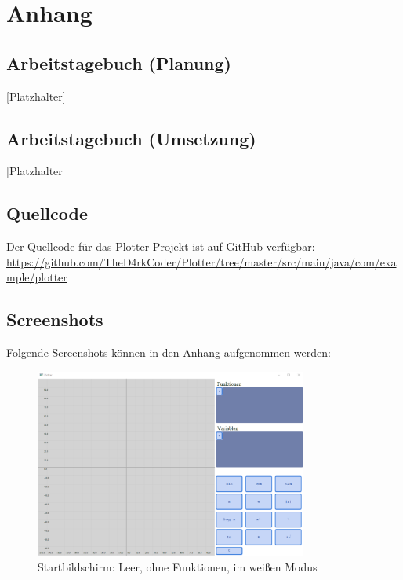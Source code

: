 \documentclass[a4paper]{article}
\begin{document}
\newpage

\section{Anhang}

\subsection{Arbeitstagebuch (Planung)}
[Platzhalter]

\subsection{Arbeitstagebuch (Umsetzung)}
[Platzhalter]

\subsection{Quellcode}
Der Quellcode für das Plotter-Projekt ist auf GitHub verfügbar:
\url{https://github.com/TheD4rkCoder/Plotter/tree/master/src/main/java/com/example/plotter}

\clearpage

\subsection{Screenshots}
Folgende Screenshots können in den Anhang aufgenommen werden:
\begin{figure}[ht]
	\centering
	\includegraphics[width=0.8\textwidth]{Resources/startbildschirm.png}
	\caption{Startbildschirm: Leer, ohne Funktionen, im weißen Modus}
	\label{fig:startbildschirm}
\end{figure}
\end{document}
